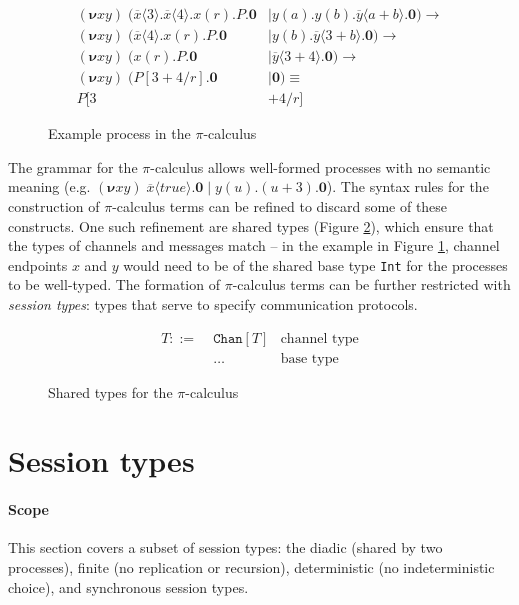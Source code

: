 \documentclass{mproj}
\newcommand{\PO}{\mathbf{0}}
\newcommand{\comp}[2]{#1 \mid #2}
\newcommand{\new}[2]{(\boldsymbol{\nu} #1 #2) \;}
\newcommand{\cout}[2]{\overline{#1}\langle#2\rangle.}
\newcommand{\cin}[2]{#1(#2).}
\newcommand{\subst}[3]{#1[#2/#3]}
\newcommand{\picalc}{$\pi$-calculus}
\newcommand{\type}{\texttt}
\newcommand{\reduce}{\rightarrow}
\begin{document}
\begin{figure}[H]
    \begin{align*}
    \new{x}{y} (\comp{\cout{x}{3} \cout{x}{4} \cin{x}{r} P. \PO &}
                     {\cin{y}{a} \cin{y}{b} \cout{y}{a+b} \PO})
    \reduce
    \\
    \new{x}{y} (\comp{\cout{x}{4} \cin{x}{r} P. \PO &}
                     {\cin{y}{b} \cout{y}{3+b} \PO})
    \reduce
    \\
    \new{x}{y} (\comp{\cin{x}{r} P. \PO &}
                     {\cout{y}{3+4} \PO})
    \reduce
    \\
    \new{x}{y} (\comp{\subst{P}{3+4}{r}. \PO &}
                     {\PO})
    \equiv
    \\
    \subst{P}{3&+4}{r}
    \end{align*}
    \caption{Example process in the \picalc{}}
    \label{picalc-example}
\end{figure}

The grammar for the \picalc{} allows well-formed processes with no semantic meaning (e.g. $\new{x}{y} \comp {\cout{x}{true}\PO} {\cin{y}{u}(u+3).\PO}$). The syntax rules for the construction of \picalc{} terms can be refined to discard some of these constructs. One such refinement are shared types (Figure \ref{picalc-shared-types}), which ensure that the types of channels and messages match -- in the example in Figure \ref{picalc-example}, channel endpoints $x$ and $y$ would need to be of the shared base type \type{Int} for the processes to be well-typed. The formation of \picalc{} terms can be further restricted with \emph{session types}: types that serve to specify communication protocols.

\begin{figure}[H]
    \begin{align*}
    T ::= \; &\type{Chan}[T] & \text{channel type} \\
             &\ldots         & \text{base type}
    \end{align*}
    \caption{Shared types for the \picalc{}}
    \label{picalc-shared-types}
\end{figure}

\section{Session types}\label{session-types}

\paragraph{Scope} This section covers a subset of session types: the diadic (shared by two processes), finite (no replication or recursion), deterministic (no indeterministic choice), and synchronous session types.
\end{document}
